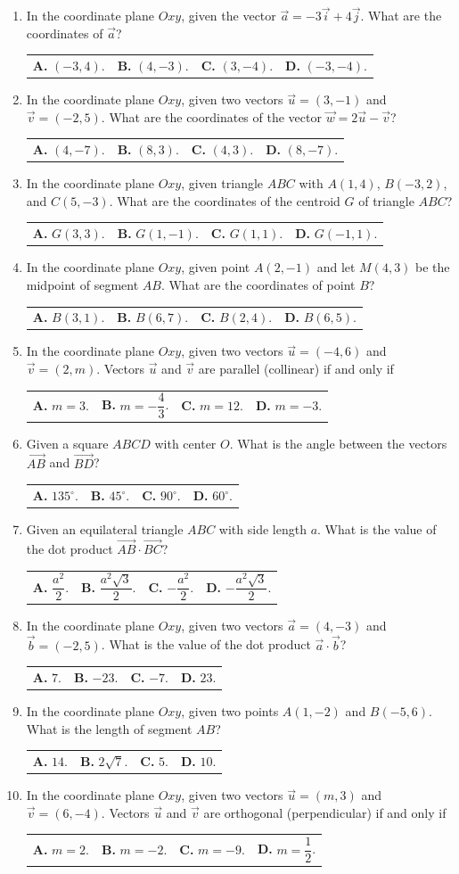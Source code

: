 \documentclass[10pt,a4paper]{article}
\makeatletter
\newcommand{\four}[4]{\par\noindent\begin{tabularx}{\linewidth}{@{}*{4}{>{\raggedright\arraybackslash}X}@{}}\textbf{A.} #1&\textbf{B.} #2&\textbf{C.} #3&\textbf{D.} #4\end{tabularx}}
\makeatother
\begin{document}
\begin{enumerate}
\item In the coordinate plane $Oxy$, given the vector $\vec{a} = -3\vec{i} + 4\vec{j}$. What are the coordinates of $\vec{a}$?
\four{$(-3, 4)$.}{$(4, -3)$.}{$(3, -4)$.}{$(-3, -4)$.}

\item In the coordinate plane $Oxy$, given two vectors $\vec{u} = (3, -1)$ and $\vec{v} = (-2, 5)$. What are the coordinates of the vector $\vec{w} = 2\vec{u} - \vec{v}$?
\four{$(4, -7)$.}{$(8, 3)$.}{$(4, 3)$.}{$(8, -7)$.}

\item In the coordinate plane $Oxy$, given triangle $ABC$ with $A(1, 4)$, $B(-3, 2)$, and $C(5, -3)$. What are the coordinates of the centroid $G$ of triangle $ABC$?
\four{$G(3, 3)$.}{$G(1, -1)$.}{$G(1, 1)$.}{$G(-1, 1)$.}

\item In the coordinate plane $Oxy$, given point $A(2, -1)$ and let $M(4, 3)$ be the midpoint of segment $AB$. What are the coordinates of point $B$?
\four{$B(3, 1)$.}{$B(6, 7)$.}{$B(2, 4)$.}{$B(6, 5)$.}
\pagebreak

\item In the coordinate plane $Oxy$, given two vectors $\vec{u} = (-4, 6)$ and $\vec{v} = (2, m)$. Vectors $\vec{u}$ and $\vec{v}$ are parallel (collinear) if and only if
\four{$m = 3$.}{$m = -\dfrac{4}{3}$.}{$m = 12$.}{$m = -3$.}

\item Given a square $ABCD$ with center $O$. What is the angle between the vectors $\vec{AB}$ and $\vec{BD}$?
\four{$135^\circ$.}{$45^\circ$.}{$90^\circ$.}{$60^\circ$.}

\item Given an equilateral triangle $ABC$ with side length $a$. What is the value of the dot product $\vec{AB} \cdot \vec{BC}$?
\four{$\dfrac{a^2}{2}$.}{$\dfrac{a^2\sqrt{3}}{2}$.}{$-\dfrac{a^2}{2}$.}{$-\dfrac{a^2\sqrt{3}}{2}$.}

\item In the coordinate plane $Oxy$, given two vectors $\vec{a} = (4, -3)$ and $\vec{b} = (-2, 5)$. What is the value of the dot product $\vec{a} \cdot \vec{b}$?
\four{$7$.}{$-23$.}{$-7$.}{$23$.}

\item In the coordinate plane $Oxy$, given two points $A(1, -2)$ and $B(-5, 6)$. What is the length of segment $AB$?
\four{$14$.}{$2\sqrt{7}$.}{$5$.}{$10$.}

\item In the coordinate plane $Oxy$, given two vectors $\vec{u} = (m, 3)$ and $\vec{v} = (6, -4)$. Vectors $\vec{u}$ and $\vec{v}$ are orthogonal (perpendicular) if and only if
\four{$m = 2$.}{$m = -2$.}{$m = -9$.}{$m = \dfrac{1}{2}$.}


\end{enumerate}
\end{document}
